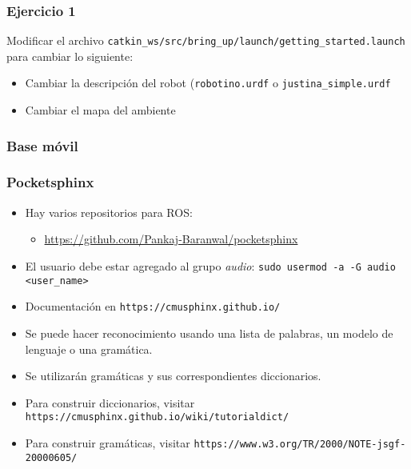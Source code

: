 \documentclass[10pt,spanish,aspectratio=1610]{beamer}
\begin{document}
\begin{frame}\frametitle{Ejercicio 1}
  Modificar el archivo \texttt{catkin\_ws/src/bring\_up/launch/getting\_started.launch} para cambiar lo siguiente:
  \begin{itemize}
  \item Cambiar la descripción del robot (\texttt{robotino.urdf} o \texttt{justina\_simple.urdf}
  \item Cambiar el mapa del ambiente
  \end{itemize}
\end{frame}

\begin{frame}\frametitle{Base móvil}
  
\end{frame}

\begin{frame}\frametitle{Pocketsphinx}
  \begin{itemize}
  \item Hay varios repositorios para ROS:
    \begin{itemize}
    \item \url{https://github.com/Pankaj-Baranwal/pocketsphinx}
    \end{itemize}
  \item El usuario debe estar agregado al grupo \textit{audio}: \texttt{sudo usermod -a -G audio <user\_name>}
  \item Documentación en \texttt{https://cmusphinx.github.io/}
  \item Se puede hacer reconocimiento usando una lista de palabras, un modelo de lenguaje o una gramática.
  \item Se utilizarán gramáticas y sus correspondientes diccionarios.
  \item Para construir diccionarios, visitar \texttt{https://cmusphinx.github.io/wiki/tutorialdict/}
    \item Para construir gramáticas, visitar \texttt{https://www.w3.org/TR/2000/NOTE-jsgf-20000605/}
  \end{itemize}
\end{frame}
\end{document}
